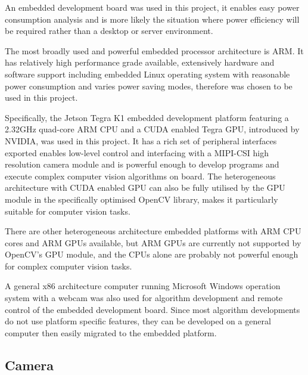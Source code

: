 
An embedded development board was used in this project, it enables easy power consumption analysis and is more likely the situation where power efficiency will be required rather than a desktop or server environment.

The most broadly used and powerful embedded processor architecture is ARM. It has relatively high performance grade available, extensively hardware and software support including embedded Linux operating system with reasonable power consumption and varies power saving modes, therefore was chosen to be used in this project.

Specifically, the Jetson Tegra K1 embedded development platform \cite{NVIDIA:tk1} featuring a 2.32GHz quad-core ARM CPU and a CUDA enabled Tegra GPU, introduced by NVIDIA, was used in this project. It has a rich set of peripheral interfaces exported enables low-level control and interfacing with a MIPI-CSI high resolution camera module and is powerful enough to develop programs and execute complex computer vision algorithms on board. The heterogeneous architecture with CUDA enabled GPU can also be fully utilised by the GPU module in the specifically optimised OpenCV library, makes it particularly suitable for computer vision tasks.

There are other heterogeneous architecture embedded platforms with ARM CPU cores and ARM GPUs available, but ARM GPUs are currently not supported by OpenCV's GPU module, and the CPUs alone are probably not powerful enough for complex computer vision tasks.


A general x86 architecture computer running Microsoft Windows operation system with a webcam was also used for algorithm development and remote control of the embedded development board. Since most algorithm developments do not use platform specific features, they can be developed on a general computer then easily migrated to the embedded platform.

\subsection{Camera}


